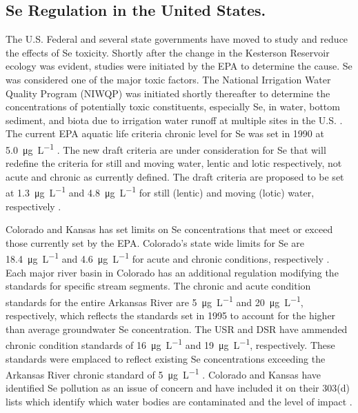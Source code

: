 \begin{linenumbers}[1]
\subsection*{Se Regulation in the United States.}
The U.S. Federal and several state governments have moved to study and reduce the effects of Se toxicity.  Shortly after the change in the Kesterson Reservoir ecology was evident, studies were initiated by the EPA to determine the cause.  Se was considered one of the major toxic factors.  The National Irrigation Water Quality Program (NIWQP) was initiated shortly thereafter to determine the concentrations of potentially toxic constituents, especially Se, in water, bottom sediment, and biota due to irrigation water runoff at multiple sites in the U.S. \citep{Hamilton1999}.  The current EPA aquatic life criteria chronic level for Se was set in 1990 at \SI{5.0}{\micro\gram\per\liter} \citep{EPA-Se}.  The new draft criteria are under consideration for Se that will redefine the criteria for still and moving water, lentic and lotic respectively, not acute and chronic as currently defined.  The draft criteria are proposed to be set at \SI{1.3}{\micro\gram\per\liter} and \SI{4.8}{\micro\gram\per\liter} for still (lentic) and moving (lotic) water, respectively \citep{2014USEPA,Hamilton1999,EPA-Se}.

Colorado and Kansas has set limits on Se concentrations that meet or exceed those currently set by the EPA.  Colorado's state wide limits for Se are \SI{18.4}{\micro\gram\per\liter} and \SI{4.6}{\micro\gram\per\liter} for acute and chronic conditions, respectively \citep{5CCR1002-31}.  Each major river basin in Colorado has an additional regulation modifying the standards for specific stream segments.  The chronic and acute condition standards for the entire Arkansas River are \SI{5}{\micro\gram\per\liter} and \SI{20}{\micro\gram\per\liter}, respectively, which reflects the standards set in 1995 to account for the higher than average groundwater Se concentration.  The USR and DSR have ammended chronic condition standards of \SI{16}{\micro\gram\per\liter} and \SI{19}{\micro\gram\per\liter}, respectively.  These standards were emplaced to reflect existing Se concentrations exceeding the Arkansas River chronic standard of \SI{5}{\micro\gram\per\liter} \citep{5CCR1002-32}.  Colorado and Kansas have identified Se pollution as an issue of concern and have included it on their 303(d) lists which identify which water bodies are contaminated and the level of impact \citep{5CCR1002-93,2014Kansas303d}.


\end{linenumbers}
